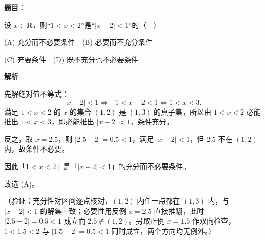 \begin{answer}

\textbf{题目}：

设 \(x\in\mathbf{R}\)，则“\(1<x<2\)”是“\(|x-2|<1\)”的（　）

(A) 充分而不必要条件　(B) 必要而不充分条件

(C) 充要条件　(D) 既不充分也不必要条件

\textbf{解析}

先解绝对值不等式：
\nopagebreak[4]
\[
|x-2|<1\iff -1<x-2<1\iff 1<x<3.
\]
满足 \(1<x<2\) 的 \(x\) 的集合 \((1,2)\) 是 \((1,3)\) 的真子集，所以由 \(1<x<2\) 必能推出 \(1<x<3\)，即必能推出 \(|x-2|<1\)，条件充分。

反之，取 \(x=2.5\)，则 \(|2.5-2|=0.5<1\)，满足 \(|x-2|<1\)，但 \(2.5\) 不在 \((1,2)\) 内，故条件不必要。

因此「\(1<x<2\)」是「\(|x-2|<1\)」的充分而不必要条件。

故选 (A)。

（验证：充分性对区间逐点核对，\((1,2)\) 内任一点都在 \((1,3)\) 内，与 \(|x-2|<1\) 的解集一致；必要性用反例 \(x=2.5\) 直接推翻，此时 \(|2.5-2|=0.5<1\) 成立而 \(2.5\notin(1,2)\)。另取正例 \(x=1.5\) 作双向检查，\(1<1.5<2\) 与 \(|1.5-2|=0.5<1\) 同时成立，两个方向均无例外。）


\end{answer}

